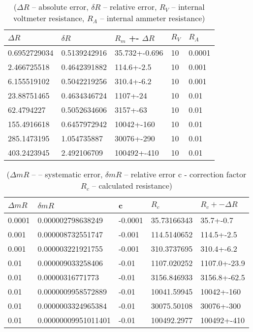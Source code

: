\begin{table}[!ht]
	\centering
	\begin{tabular}{|l|l|l|l|l|}
		\hline
		$\Delta R$ & $\delta R$ & $R_m$ +- $\Delta R$ & $R_V$ & $R_A$ \\ \hline
		0.6952729034 & 0.5139242916 & 35.732+-0.696 & 10 & 0.0001 \\ \hline
		2.466725518 & 0.4642391882 & 114.6+-2.5 & 10 & 0.001 \\ \hline
		6.155519102 & 0.5042219256 & 310.4+-6.2 & 10 & 0.001 \\ \hline
		23.88751465 & 0.4634346724 & 1107+-24 & 10 & 0.01 \\ \hline
		62.4794227 & 0.5052634606 & 3157+-63 & 10 & 0.01 \\ \hline
		155.4916618 & 0.6457972942 & 10042+-160 & 10 & 0.01 \\ \hline
		285.1473195 & 1.054735887 & 30076+-290 & 10 & 0.01 \\ \hline
		403.2423945 & 2.492106709 & 100492+-410 & 10 & 0.01 \\ \hline
	\end{tabular}
	\caption{($\Delta R$ -- absolute error, $\delta R$ -- relative error, $R_V$ -- internal voltmeter resistance, $R_A$ -- internal ammeter resistance)}
\end{table}

\begin{table}[H]
	\centering
	\begin{tabular}{|l|l|l|l|l|}
		\hline
		$\Delta mR$ & $\delta mR$ & c & $R_c$ & $R_c+- \Delta R$ \\ \hline
		0.0001 & 0.000002798638249 & -0.0001 & 35.73166343 & 35.7+-0.7 \\ \hline
		0.001 & 0.000008732551747 & -0.001 & 114.5140652 & 114.5+-2.5 \\ \hline
		0.001 & 0.000003221921755 & -0.001 & 310.3737695 & 310.4+-6.2 \\ \hline
		0.01 & 0.000009033258406 & -0.01 & 1107.020252 & 1107.0+-23.9 \\ \hline
		0.01 & 0.00000316771773 & -0.01 & 3156.846933 & 3156.8+-62.5 \\ \hline
		0.01 & 0.0000009958572889 & -0.01 & 10041.59945 & 10042+-160 \\ \hline
		0.01 & 0.0000003324965384 & -0.01 & 30075.50108 & 30076+-300 \\ \hline
		0.01 & 0.00000009951011401 & -0.01 & 100492.2977 & 100492+-410 \\ \hline    \end{tabular}
	\caption{($\Delta mR$ -- – systematic error, $\delta mR$ -- relative error  c - correction factor  $R_c$ -- calculated resistance)}
	
\end{table}

